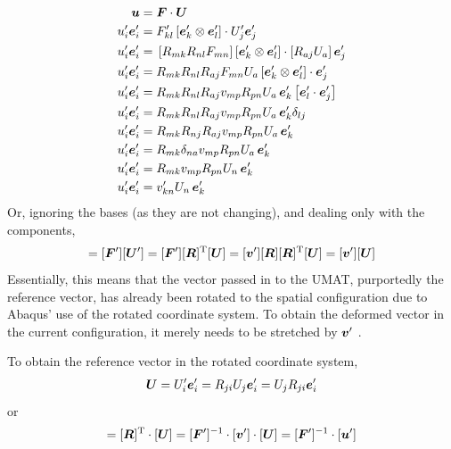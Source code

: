 \documentclass[10pt,letterpaper,oneside]{report}
\newcommand{\ten}[1]{\mbox{\boldmath $#1$}{}}
\newcommand{\scas}[1]{\mbox{{\scriptsize{${\rm{#1}}$}}}{}}
\begin{document}
\begin{align}
\ten{u} ={}& \ten{F} \cdot \ten{U} 
\\
u'_i \ten{e}'_i ={}& F'_{kl} \left[ \ten{e}'_k \otimes \ten{e}'_l \right] \cdot U'_j \ten{e}'_j 
\notag \\
u'_i \ten{e}'_i ={}& \left[ R_{mk} R_{nl} F_{mn} \right] \left[ \ten{e}'_k \otimes \ten{e}'_l \right] \cdot \left[ R_{aj} U_a \right] \ten{e}'_j 
\notag \\
u'_i \ten{e}'_i ={}& R_{mk} R_{nl} R_{aj} F_{mn} U_a \left[ \ten{e}'_k \otimes \ten{e}'_l \right] \cdot \ten{e}'_j 
\notag \\
u'_i \ten{e}'_i ={}& R_{mk} R_{nl} R_{aj} v_{mp} R_{pn} U_a \, \ten{e}'_k \left[ \ten{e}'_l \cdot \ten{e}'_j \right] 
\notag \\
u'_i \ten{e}'_i ={}& R_{mk} R_{nl} R_{aj} v_{mp} R_{pn} U_a \, \ten{e}'_k \delta_{lj} 
\notag \\
u'_i \ten{e}'_i ={}& R_{mk} R_{nj} R_{aj} v_{mp} R_{pn} U_a \, \ten{e}'_k 
\notag \\
u'_i \ten{e}'_i ={}& R_{mk} \delta_{na} v_{mp} R_{pn} U_a \, \ten{e}'_k 
\notag \\
u'_i \ten{e}'_i ={}& R_{mk} v_{mp} R_{pn} U_n \, \ten{e}'_k 
\notag \\
u'_i \ten{e}'_i ={}& v'_{kn} U_n \, \ten{e}'_k 
\end{align}
Or, ignoring the bases (as they are not changing), and dealing only with the components,
\begin{align}
[ \ten{u}' ] = [ \ten{F}' ] [ \ten{U}' ] = [ \ten{F}' ] [ \ten{R} ]^{\scas{T}} [ \ten{U} ] = [ \ten{v}' ] [ \ten{R} ] [ \ten{R} ]^{\scas{T}} [ \ten{U} ] = [ \ten{v}' ] [ \ten{U} ] 
\end{align}
Essentially, this means that the vector passed in to the UMAT, purportedly the reference vector, has already been rotated to the spatial configuration due to Abaqus' use of the rotated coordinate system.  To obtain the deformed vector in the current configuration, it merely needs to be stretched by $\ten{v}'$ \cite{SahliCostabal2017}.  

To obtain the reference vector in the rotated coordinate system,
\begin{align}
\ten{U} = U'_i \ten{e}'_i = R_{ji} U_j \ten{e}'_i = U_j R_{ji} \ten{e}'_i 
\end{align}
or
\begin{align}
[ \ten{U}' ] = [ \ten{R} ]^{\scas{T}} \cdot [ \ten{U} ] = [ \ten{F}' ]^{-1} \cdot [ \ten{v}' ] \cdot [ \ten{U} ] = [ \ten{F}' ]^{-1} \cdot [ \ten{u}' ] 
\end{align}
\end{document}
